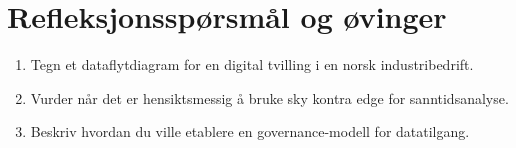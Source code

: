 \section{Refleksjonsspørsmål og øvinger}
\begin{enumerate}
    \item Tegn et dataflytdiagram for en digital tvilling i en norsk industribedrift.
    \item Vurder når det er hensiktsmessig å bruke sky kontra edge for sanntidsanalyse.
    \item Beskriv hvordan du ville etablere en governance-modell for datatilgang.
\end{enumerate}
